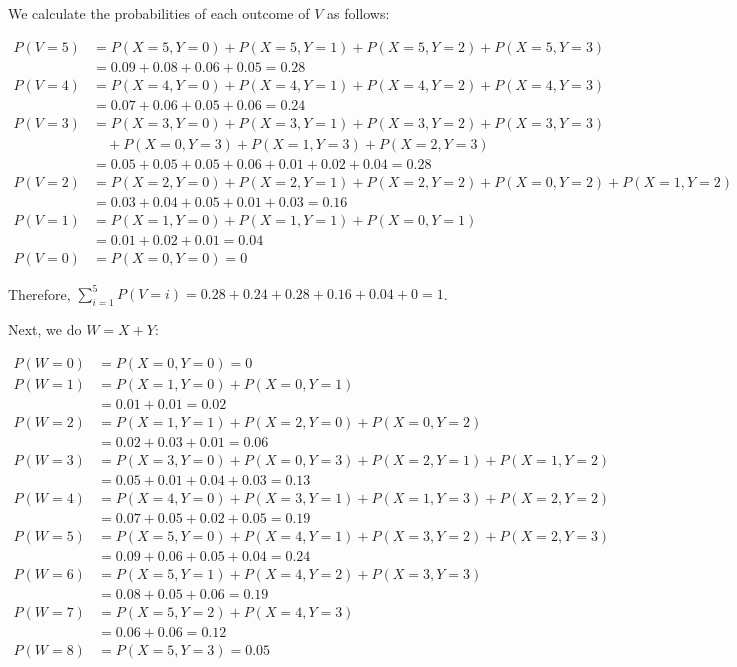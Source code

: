 \documentclass[10pt, oneside]{article}
\begin{document}
\begin{enumerate}[label=6.\arabic*]
We calculate the probabilities of each outcome of $V$ as follows:

\begin{align*}
P(V = 5) &= P(X = 5, Y = 0) + P(X = 5, Y = 1) + P(X = 5, Y = 2) + P(X = 5, Y = 3) \\
&= 0.09 + 0.08 + 0.06 + 0.05 = \boxed{0.28} \\
P(V = 4) &= P(X = 4, Y = 0) + P(X = 4, Y = 1) + P(X = 4, Y = 2) + P(X = 4, Y = 3) \\
&= 0.07 + 0.06 + 0.05 + 0.06 = \boxed{0.24} \\
P(V = 3) &= P(X = 3, Y = 0) + P(X = 3, Y = 1) + P(X = 3, Y = 2) + P(X = 3, Y = 3) \\
&\quad + P(X = 0, Y = 3) + P(X = 1, Y = 3) + P(X = 2, Y = 3) \\
&= 0.05 + 0.05 + 0.05 + 0.06 + 0.01 + 0.02 + 0.04 = \boxed{0.28} \\
P(V = 2) &= P(X = 2, Y = 0) + P(X = 2, Y = 1) + P(X = 2, Y = 2) + P(X = 0, Y = 2) + P(X = 1, Y = 2) \\
&= 0.03 + 0.04 + 0.05 + 0.01 + 0.03 = \boxed{0.16} \\
P(V = 1) &= P(X = 1, Y = 0) + P(X = 1, Y = 1) + P(X = 0, Y = 1) \\
&= 0.01 + 0.02 + 0.01 = \boxed{0.04} \\
P(V = 0) &= P(X = 0, Y = 0) = \boxed{0}
\end{align*}

Therefore, $\sum^5_{i=1} P(V = i) = 0.28 + 0.24 + 0.28 + 0.16 + 0.04 + 0 = \boxed{1}$.

Next, we do $W = X + Y$:

\begin{align*}
P(W = 0) &= P(X = 0, Y = 0) = \boxed{0} \\
P(W = 1) &= P(X = 1, Y = 0) + P(X = 0, Y = 1) \\
&= 0.01 + 0.01 = \boxed{0.02} \\
P(W = 2) &= P(X = 1, Y = 1) + P(X = 2, Y = 0) + P(X = 0, Y = 2) \\
&= 0.02 + 0.03 + 0.01 = \boxed{0.06} \\
P(W = 3) &= P(X = 3, Y = 0) + P(X = 0, Y = 3) + P(X = 2, Y = 1) + P(X = 1, Y = 2) \\
&= 0.05 + 0.01 + 0.04 + 0.03 = \boxed{0.13} \\
P(W = 4) &= P(X = 4, Y = 0) + P(X = 3, Y = 1) + P(X = 1, Y = 3) + P(X = 2, Y = 2) \\
&= 0.07 + 0.05 + 0.02 + 0.05 = \boxed{0.19} \\
P(W = 5) &= P(X = 5, Y = 0) + P(X = 4, Y = 1) + P(X = 3, Y = 2) + P(X = 2, Y = 3) \\
&= 0.09 + 0.06 + 0.05 + 0.04 = \boxed{0.24} \\
P(W = 6) &= P(X = 5, Y = 1) + P(X = 4, Y = 2) + P(X = 3, Y = 3) \\
&= 0.08 + 0.05 + 0.06 = \boxed{0.19} \\
P(W = 7) &= P(X = 5, Y = 2) + P(X = 4, Y = 3) \\
&= 0.06 + 0.06 = \boxed{0.12} \\
P(W = 8) &= P(X = 5, Y = 3) = \boxed{0.05}
\end{align*}


\end{enumerate}
\end{document}

